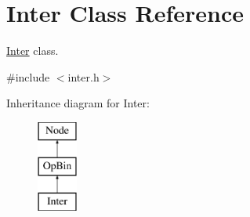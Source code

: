 \hypertarget{class_inter}{
\section{\-Inter \-Class \-Reference}
\label{class_inter}
}


\hyperlink{class_inter}{\-Inter} class.  




{\ttfamily \#include $<$inter.\-h$>$}

\-Inheritance diagram for \-Inter\-:\begin{figure}[H]
\begin{center}
\leavevmode
\includegraphics[height=3.000000cm]{class_inter}
\end{center}
\end{figure}
